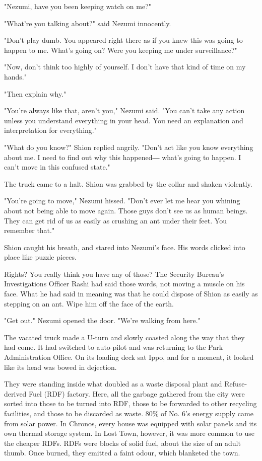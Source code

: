 "Nezumi, have you been keeping watch on me?"

"What're you talking about?" said Nezumi innocently.

"Don't play dumb. You appeared right there as if you knew this was going
to happen to me. What's going on? Were you keeping me under
surveillance?"

"Now, don't think too highly of yourself. I don't have that kind of time
on my hands."

"Then explain why."

"You're always like that, aren't you," Nezumi said. "You can't take any
action unless you understand everything in your head. You need an
explanation and interpretation for everything."

"What do you know?" Shion replied angrily. "Don't act like you know
everything about me. I need to find out why this happened― what's going
to happen. I can't move in this confused state."

The truck came to a halt. Shion was grabbed by the collar and shaken
violently.

"You're going to move," Nezumi hissed. "Don't ever let me hear you
whining about not being able to move again. Those guys don't see us as
human beings. They can get rid of us as easily as crushing an ant under
their feet. You remember that."

Shion caught his breath, and stared into Nezumi's face. His words
clicked into place like puzzle pieces.

Rights? You really think you have any of those? The Security Bureau's
Investigations Officer Rashi had said those words, not moving a muscle
on his face. What he had said in meaning was that he could dispose of
Shion as easily as stepping on an ant. Wipe him off the face of the
earth.

"Get out." Nezumi opened the door. "We're walking from here."

The vacated truck made a U-turn and slowly coasted along the way that
they had come. It had switched to auto-pilot and was returning to the
Park Administration Office. On its loading deck sat Ippo, and for a
moment, it looked like its head was bowed in dejection.

They were standing inside what doubled as a waste disposal plant and
Refuse-derived Fuel (RDF) factory. Here, all the garbage gathered from
the city were sorted into those to be turned into RDF, those to be
forwarded to other recycling facilities, and those to be discarded as
waste. 80\% of No. 6's energy supply came from solar power. In Chronos,
every house was equipped with solar panels and its own thermal storage
system. In Lost Town, however, it was more common to use the cheaper
RDFs. RDFs were blocks of solid fuel, about the size of an adult thumb.
Once burned, they emitted a faint odour, which blanketed the town.

